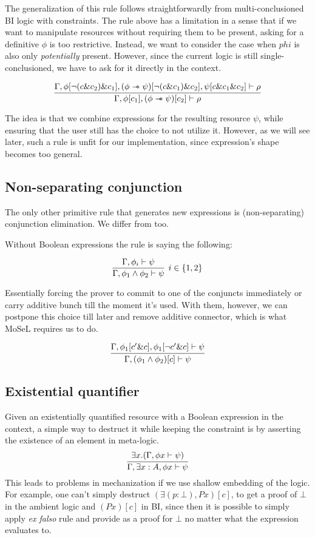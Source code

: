 The generalization of this rule follows straightforwardly from multi-conclusioned BI logic with constraints.
The rule above has a limitation in a sense that if we want to manipulate resources without requiring them to be present, asking for a definitive \(\phi\) is too restrictive.
Instead, we want to consider the case when \(phi\) is also only \emph{potentially} present.
However, since the current logic is still single-conclusioned, we have to ask for it directly in the context.

\[
\infer{\Gamma, \phi[c_1], (\phi \wand \psi)[c_2] \vdash \rho}
      {\Gamma, \phi[\neg (c \& c_2) \& c_1], (\phi \wand \psi)[\neg (c \& c_1) \& c_2], \psi[c \& c_1 \& c_2] \vdash \rho}
\]

The idea is that we combine expressions for the resulting resource \(\psi\), while ensuring that the user still has the choice to not utilize it.
However, as we will see later, such a rule is unfit for our implementation, since expression's shape becomes too general.

\subsection{Non-separating conjunction}
\label{sec:non-separ-conj}

The only other primitive rule that generates new expressions is (non-separating) conjunction elimination.
We differ from \citet{harlandResourceDistributionBooleanConstraints2003} too.

Without Boolean expressions the rule is saying the following:

\[
\infer[ i \in \{1,2\} ]
      {\Gamma, \phi_1 \wedge \phi_2 \vdash \psi}
      {\Gamma, \phi_i \vdash \psi}
\]

Essentially forcing the prover to commit to one of the conjuncts immediately or carry additive bunch till the moment it's used.
With them, however, we can postpone this choice till later and remove additive connector, which is what MoSeL requires us to do.

\[
\infer{\Gamma, (\phi_1 \wedge \phi_2)[c] \vdash \psi}
      {\Gamma, \phi_1[c' \& c], \phi_1[\neg c' \& c] \vdash \psi}
\]

\subsection{Existential quantifier}
\label{subsec:exist-quant}

Given an existentially quantified resource with a Boolean expression in the context, a simple way to destruct it while keeping the constraint is by asserting the existence of an element in meta-logic.
\[\infer{\Gamma, \exists x : A, \phi x \vdash \psi}
        { \exists x. (\Gamma, \phi x \vdash \psi)}\]
This leads to problems in mechanization if we use shallow embedding of the logic.
For example, one can't simply destruct \((\exists (p : \bot), P x)[c]\), to get a proof of \(\bot\) in the ambient logic and \((P x)[c]\) in BI, since then it is possible to simply apply \emph{ex falso} rule and provide  as a proof for \(\bot\) no matter what the expression evaluates to.

